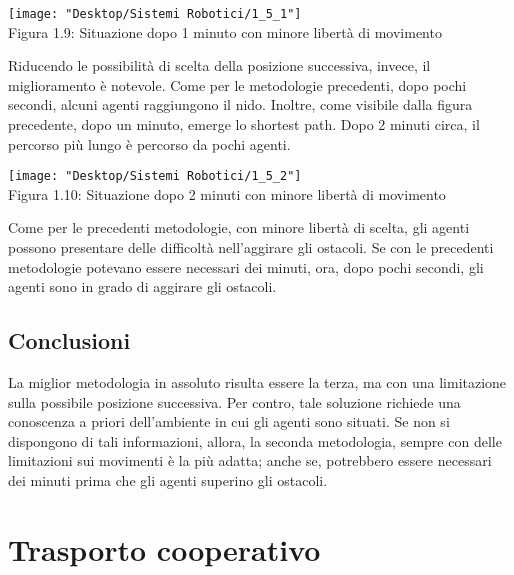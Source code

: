 \documentclass[12pt,a4paper,openright,twoside]{report}
\begin{document}
\begin{center}  
	\texttt{[image: "Desktop/Sistemi Robotici/1\_5\_1"]}
	\\Figura 1.9: Situazione dopo 1 minuto con minore libertà di movimento
\end{center}

Riducendo le possibilità di scelta della posizione successiva, invece, il miglioramento è notevole. Come per le metodologie precedenti, dopo pochi secondi, alcuni agenti raggiungono il nido. Inoltre, come visibile dalla figura precedente, dopo un minuto, emerge lo shortest path. Dopo 2 minuti circa, il percorso più lungo è percorso da pochi agenti.\\

\begin{center}  
	\texttt{[image: "Desktop/Sistemi Robotici/1\_5\_2"]}
	\\Figura 1.10: Situazione dopo 2 minuti con minore libertà di movimento
\end{center}

Come per le precedenti metodologie, con minore libertà di scelta, gli agenti possono presentare delle difficoltà nell'aggirare gli ostacoli. Se con le precedenti metodologie potevano essere necessari dei minuti, ora, dopo pochi secondi, gli agenti sono in grado di aggirare gli ostacoli.

\subsection{Conclusioni}

La miglior metodologia in assoluto risulta essere la terza, ma con una limitazione sulla possibile posizione successiva. Per contro, tale soluzione richiede una conoscenza a priori dell'ambiente in cui gli agenti sono situati. Se non si dispongono di tali informazioni, allora, la seconda metodologia, sempre con delle limitazioni sui movimenti è la più adatta; anche se, potrebbero essere necessari dei minuti prima che gli agenti superino gli ostacoli.

\section{Trasporto cooperativo}
\end{document}
